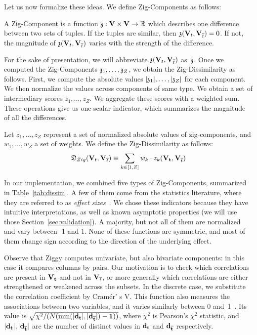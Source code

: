 Let us now formalize these ideas. We define Zig-Components as follows:
\begin{definition}
    A Zig-Component is a function $\mathfrak{z} : \mathbf{V}\times\mathbf{V} \to \mathbb{R}$
    which describes one difference between two sets of tuples. If the tuples
    are similar, then $\mathfrak{z}(\mathbf{V}_t, \mathbf{V}_{\overline{t}}) = 0$. If not,
    the magnitude of $\mathfrak{z}(\mathbf{V}_t, \mathbf{V}_{\overline{t}})$ varies with the strength
    of the difference.
\end{definition}
For the sake of presentation, we will  abbreviate $\mathfrak{z}(\mathbf{V}_t, \mathbf{V}_{\overline{t}})$
as~$\mathfrak{z}$. 
Once we computed the Zig-Components $\mathfrak{z}_1, \ldots, \mathfrak{z}_Z$,
we obtain the Zig-Dissimilarity as follows. First, we compute the absolute
values $|\mathfrak{z}_1|, \ldots, |\mathfrak{z}_Z|$ for each component. We then normalize
the values across components of same type. We obtain a set of intermediary
scores $z_1, \ldots, z_Z$. We aggregate these scores with a weighted sum.
These operations give us one scalar indicator, which summarizes the magnitude
of all the differences.
\begin{definition}
    Let $z_1, \ldots, z_Z$ represent a set of normalized absolute values of
    zig-components, and $w_1, \ldots, w_Z$ a set of weights.  We
    define the Zig-Dissimilarity as follows: 
    \begin{equation}
        \mathfrak{D}_{Zig}(\mathbf{V}_t, \mathbf{V}_{\overline{t}}) 
        \equiv \sum_{k \in [1, Z]} w_k \cdot z_k(\mathbf{V_t}, \mathbf{V}_{\overline{t}})
    \end{equation}
\end{definition}

In our implementation, we combined five types of Zig-Com\-po\-nents, summarized
in Table~\ref{tab:dissim}.  A few of them come from the statistics literature,
where they are referred to as \emph{effect sizes}~\cite{cohen1977statistical,
hedges2014statistical}.  We chose these indicators because they have intuitive
interpretations, as well as known asymptotic properties (we will use those
Section~\ref{sec:validation}).  A majority, but not all of them are normalized
and vary between -1 and 1. None of these functions are symmetric, and most of
them change sign according to the direction of the underlying effect.

Observe that Ziggy computes univariate, but also bi\-va\-riate components: in this
case it compares columns by pairs. Our motivation is to check which
correlations are present in $\bf{V}_t$ and not in $\mathbf{V}_{\overline{t}}$, or more
generally which correlations are either strengthened or weakened across the
subsets. In the discrete case, we substitute the correlation coefficient by
Cram\'er' s V.  This function also measures the associations between two
variables, and it varies similarly between 0 and~1~\cite{cohen1977statistical}.
Its value is $\sqrt{\chi^2/(N(\min(|\bf{d}_t|,|\bf{d}_{\overline{t}}|) - 1))}$, where
$\chi^2$ is Pearson's $\chi^2$ statistic, and $|\bf{d}_t|,|\bf{d}_{\overline{t}}|$ are
the number of distinct values in $\bf{d}_t$ and $\bf{d}_{\overline{t}}$ respectively.

